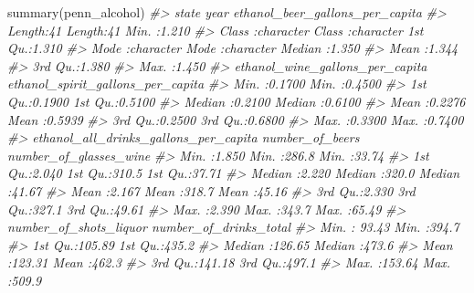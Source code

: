 \documentclass[
  12pt,
]{book}
\newenvironment{Shaded}{\begin{snugshade}}{\end{snugshade}}
\newcommand{\CommentTok}[1]{\textcolor[rgb]{0.37,0.37,0.37}{\textit{#1}}}
\newcommand{\FunctionTok}[1]{\textcolor[rgb]{0,0,0}{#1}}
\newcommand{\NormalTok}[1]{#1}
\begin{document}
\begin{Shaded}
\begin{Highlighting}[]
\FunctionTok{summary}\NormalTok{(penn\_alcohol)}
\CommentTok{\#\textgreater{}     state               year           ethanol\_beer\_gallons\_per\_capita}
\CommentTok{\#\textgreater{}  Length:41          Length:41          Min.   :1.210                  }
\CommentTok{\#\textgreater{}  Class :character   Class :character   1st Qu.:1.310                  }
\CommentTok{\#\textgreater{}  Mode  :character   Mode  :character   Median :1.350                  }
\CommentTok{\#\textgreater{}                                        Mean   :1.344                  }
\CommentTok{\#\textgreater{}                                        3rd Qu.:1.380                  }
\CommentTok{\#\textgreater{}                                        Max.   :1.450                  }
\CommentTok{\#\textgreater{}  ethanol\_wine\_gallons\_per\_capita ethanol\_spirit\_gallons\_per\_capita}
\CommentTok{\#\textgreater{}  Min.   :0.1700                  Min.   :0.4500                   }
\CommentTok{\#\textgreater{}  1st Qu.:0.1900                  1st Qu.:0.5100                   }
\CommentTok{\#\textgreater{}  Median :0.2100                  Median :0.6100                   }
\CommentTok{\#\textgreater{}  Mean   :0.2276                  Mean   :0.5939                   }
\CommentTok{\#\textgreater{}  3rd Qu.:0.2500                  3rd Qu.:0.6800                   }
\CommentTok{\#\textgreater{}  Max.   :0.3300                  Max.   :0.7400                   }
\CommentTok{\#\textgreater{}  ethanol\_all\_drinks\_gallons\_per\_capita number\_of\_beers number\_of\_glasses\_wine}
\CommentTok{\#\textgreater{}  Min.   :1.850                         Min.   :286.8   Min.   :33.74         }
\CommentTok{\#\textgreater{}  1st Qu.:2.040                         1st Qu.:310.5   1st Qu.:37.71         }
\CommentTok{\#\textgreater{}  Median :2.220                         Median :320.0   Median :41.67         }
\CommentTok{\#\textgreater{}  Mean   :2.167                         Mean   :318.7   Mean   :45.16         }
\CommentTok{\#\textgreater{}  3rd Qu.:2.330                         3rd Qu.:327.1   3rd Qu.:49.61         }
\CommentTok{\#\textgreater{}  Max.   :2.390                         Max.   :343.7   Max.   :65.49         }
\CommentTok{\#\textgreater{}  number\_of\_shots\_liquor number\_of\_drinks\_total}
\CommentTok{\#\textgreater{}  Min.   : 93.43         Min.   :394.7         }
\CommentTok{\#\textgreater{}  1st Qu.:105.89         1st Qu.:435.2         }
\CommentTok{\#\textgreater{}  Median :126.65         Median :473.6         }
\CommentTok{\#\textgreater{}  Mean   :123.31         Mean   :462.3         }
\CommentTok{\#\textgreater{}  3rd Qu.:141.18         3rd Qu.:497.1         }
\CommentTok{\#\textgreater{}  Max.   :153.64         Max.   :509.9}
\end{Highlighting}
\end{Shaded}
\end{document}
